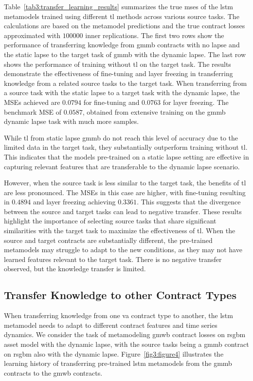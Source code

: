 Table~\ref{tab3:transfer_learning_results} summarizes the true \gls{mse}s of the \gls{lstm} metamodels trained using different \gls{tl} methods across various source tasks.
The calculations are based on the metamodel predictions and the true contract losses approximated with $\num{100000}$ inner replications.
The first two rows show the performance of transferring knowledge from \gls{gmmb} contracts with no lapse and the static lapse to the target task of \gls{gmmb} with the dynamic lapse.
The last row shows the performance of training without \gls{tl} on the target task.
The results demonstrate the effectiveness of fine-tuning and layer freezing in transferring knowledge from a related source tasks to the target task. 
When transferring from a source task with the static lapse to a target task with the dynamic lapse, the MSEs achieved are $0.0794$ for fine-tuning and $0.0763$ for layer freezing.
The benchmark MSE of $0.0587$, obtained from extensive training on the \gls{gmmb} dynamic lapse task with much more samples.

While \gls{tl} from static lapse \gls{gmmb} do not reach this level of accuracy due to the limited data in the target task, they substantially outperform training without \gls{tl}. 
This indicates that the models pre-trained on a static lapse setting are effective in capturing relevant features that are transferable to the dynamic lapse scenario.

However, when the source task is less similar to the target task, the benefits of \gls{tl} are less pronounced. The MSEs in this case are higher, with fine-tuning resulting in $0.4894$ and layer freezing achieving $0.3361$. 
This suggests that the divergence between the source and target tasks can lead to negative transfer.
These results highlight the importance of selecting source tasks that share significant similarities with the target task to maximize the effectiveness of \gls{tl}. 
When the source and target contracts are substantially different, the pre-trained metamodels may struggle to adapt to the new conditions, as they may not have learned features relevant to the target task.
There is no negative transfer observed, but the knowledge transfer is limited.

\subsection{Transfer Knowledge to other Contract Types}

When transferring knowledge from one \gls{va} contract type to another, the \gls{lstm} metamodel needs to adapt to different contract features and time series dynamics.
We consider the task of metamodeling \gls{gmwb} contract losses on \gls{rsgbm} asset model with the dynamic lapse, with the source tasks being a \gls{gmmb} contract on \gls{rsgbm} also with the dynamic lapse.
Figure~\ref{fig3:figure4} illustrates the learning history of transferring pre-trained \gls{lstm} metamodels from the \gls{gmmb} contracts to the \gls{gmwb} contracts.


